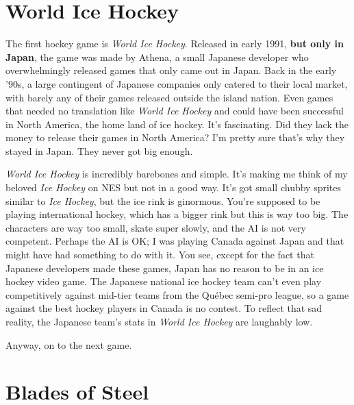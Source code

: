 \documentclass{book}
\let\oldcenter\center
\let\oldendcenter\endcenter
\renewenvironment{center}{\setlength\topsep{0pt}\oldcenter}{\oldendcenter}
\begin{document}
\FloatBarrier\needspace{10mm}\section*{World Ice Hockey}\nopagebreak[4]

\begin{center}
\quad\vspace{4pt}
\quad\vspace{4pt}
\end{center}

The first hockey game is \emph{World Ice Hockey}. Released in early 1991, \textbf{but only in Japan}, the game was made by Athena, a small Japanese developer who overwhelmingly released games that only came out in Japan. Back in the early ’90s, a large contingent of Japanese companies only catered to their local market, with barely any of their games released outside the island nation. Even games that needed no translation like \emph{World Ice Hockey} and could have been successful in North America, the home land of ice hockey. It’s fascinating. Did they lack the money to release their games in North America? I’m pretty sure that’s why they stayed in Japan. They never got big enough.

\emph{World Ice Hockey} is incredibly barebones and simple. It’s making me think of my beloved \emph{Ice Hockey} on NES but not in a good way. It’s got small chubby sprites similar to \emph{Ice Hockey}, but the ice rink is ginormous. You’re supposed to be playing international hockey, which has a bigger rink but this is way too big. The characters are way too small, skate super slowly, and the AI is not very competent. Perhaps the AI is OK; I was playing Canada against Japan and that might have had something to do with it. You see, except for the fact that Japanese developers made these games, Japan has no reason to be in an ice hockey video game. The Japanese national ice hockey team can’t even play competitively against mid-tier teams from the Québec semi-pro league, so a game against the best hockey players in Canada is no contest. To reflect that sad reality, the Japanese team’s stats in \emph{World Ice Hockey} are laughably low.

Anyway, on to the next game.

\FloatBarrier\needspace{10mm}\section*{Blades of Steel}\nopagebreak[4]
\end{document}

